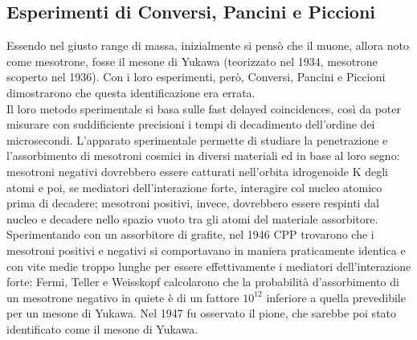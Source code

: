 \subsection{Esperimenti di Conversi, Pancini e Piccioni}

Essendo nel giusto range di massa, inizialmente si pensò che il muone, allora noto come mesotrone, fosse il mesone di Yukawa (teorizzato nel 1934, mesotrone scoperto nel 1936). Con i loro esperimenti, però, Conversi, Pancini e Piccioni dimostrarono che questa identificazione era errata.\\
Il loro metodo sperimentale si basa sulle fast delayed coincidences, così da poter misurare con suddificiente precisioni i tempi di decadimento dell'ordine dei microsecondi. L'apparato sperimentale permette di studiare la penetrazione e l'assorbimento di mesotroni cosmici in diversi materiali ed in base al loro segno: mesotroni negativi dovrebbero essere catturati nell'orbita idrogenoide K degli atomi e poi, se mediatori dell'interazione forte, interagire col nucleo atomico prima di decadere; mesotroni positivi, invece, dovrebbero essere respinti dal nucleo e decadere nello spazio vuoto tra gli atomi del materiale assorbitore.\\
Sperimentando con un assorbitore di grafite, nel 1946 CPP trovarono che i mesotroni positivi e negativi si comportavano in maniera praticamente identica e con vite medie troppo lunghe per essere effettivamente i mediatori dell'interazione forte: Fermi, Teller e Weisskopf calcolarono che la probabilità d'assorbimento di un mesotrone negativo in quiete è di un fattore $ 10^{12} $ inferiore a quella prevedibile per un mesone di Yukawa. Nel 1947 fu osservato il pione, che sarebbe poi stato identificato come il mesone di Yukawa.










